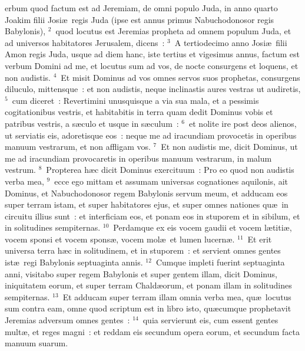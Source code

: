 \bchapter
{}erbum quod factum est ad Jeremiam, de omni populo Juda, in anno quarto Joakim filii Josi\ae\ regis Juda (ipse est annus primus Nabuchodonosor regis Babylonis),
${}^{2}$~quod locutus est Jeremias propheta ad omnem populum Juda, et ad universos habitatores Jerusalem, dicens~:
${}^{3}$~A tertiodecimo anno Josi\ae\ filii Amon regis Juda, usque ad diem hanc, iste tertius et vigesimus annus, factum est verbum Domini ad me, et locutus sum ad vos, de nocte consurgens et loquens, et non audistis.
${}^{4}$~Et misit Dominus ad vos omnes servos suos prophetas, consurgens diluculo, mittensque~: et non audistis, neque inclinastis aures vestras ut audiretis,
${}^{5}$~cum diceret~: Revertimini unusquisque a via sua mala, et a pessimis cogitationibus vestris, et habitabitis in terra quam dedit Dominus vobis et patribus vestris, a s\ae culo et usque in s\ae culum~:
${}^{6}$~et nolite ire post deos alienos, ut serviatis eis, adoretisque eos~: neque me ad iracundiam provocetis in operibus manuum vestrarum, et non affligam vos.
${}^{7}$~Et non audistis me, dicit Dominus, ut me ad iracundiam provocaretis in operibus manuum vestrarum, in malum vestrum.
${}^{8}$~Propterea h\ae c dicit Dominus exercituum~: Pro eo quod non audistis verba mea,
${}^{9}$~ecce ego mittam et assumam universas cognationes aquilonis, ait Dominus, et Nabuchodonosor regem Babylonis servum meum, et adducam eos super terram istam, et super habitatores ejus, et super omnes nationes qu\ae\ in circuitu illius sunt~: et interficiam eos, et ponam eos in stuporem et in sibilum, et in solitudines sempiternas.
${}^{10}$~Perdamque ex eis vocem gaudii et vocem l\ae titi\ae , vocem sponsi et vocem spons\ae , vocem mol\ae\ et lumen lucern\ae .
${}^{11}$~Et erit universa terra h\ae c in solitudinem, et in stuporem~: et servient omnes gentes ist\ae\ regi Babylonis septuaginta annis.
${}^{12}$~Cumque impleti fuerint septuaginta anni, visitabo super regem Babylonis et super gentem illam, dicit Dominus, iniquitatem eorum, et super terram Chald\ae orum, et ponam illam in solitudines sempiternas.
${}^{13}$~Et adducam super terram illam omnia verba mea, qu\ae\ locutus sum contra eam, omne quod scriptum est in libro isto, qu\ae cumque prophetavit Jeremias adversum omnes gentes~:
${}^{14}$~quia servierunt eis, cum essent gentes mult\ae , et reges magni~: et reddam eis secundum opera eorum, et secundum facta manuum suarum.


